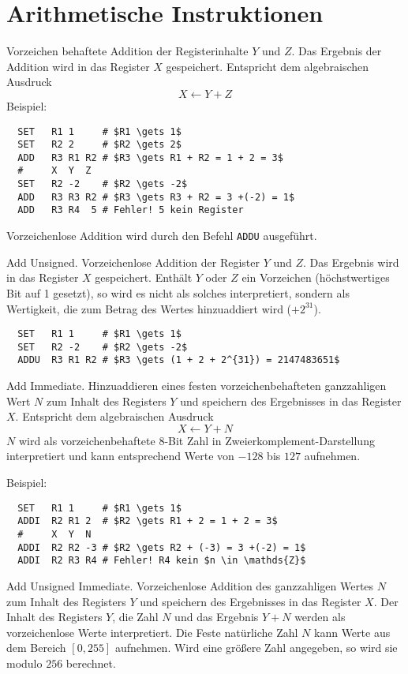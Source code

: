 \section{Arithmetische Instruktionen} 

Vorzeichen behaftete Addition der Registerinhalte $Y$ und $Z$.
Das Ergebnis der Addition wird in das Register $X$ gespeichert.
Entspricht dem algebraischen Ausdruck
\[
    X \gets Y + Z
\]
Beispiel:
\begin{lstlisting}
  SET   R1 1     # $R1 \gets 1$
  SET   R2 2     # $R2 \gets 2$
  ADD   R3 R1 R2 # $R3 \gets R1 + R2 = 1 + 2 = 3$
  #     X  Y  Z
  SET   R2 -2    # $R2 \gets -2$
  ADD   R3 R3 R2 # $R3 \gets R3 + R2 = 3 +(-2) = 1$
  ADD   R3 R4  5 # Fehler! 5 kein Register
\end{lstlisting}
Vorzeichenlose Addition wird durch den Befehl \texttt{ADDU} ausgeführt.


\glqq Add Unsigned\grqq.
Vorzeichenlose Addition der Register $Y$ und $Z$. Das Ergebnis wird in das
Register $X$ gespeichert. Enthält $Y$ oder $Z$ ein Vorzeichen (höchstwertiges
Bit auf 1 gesetzt), so wird es nicht als solches interpretiert, sondern als
Wertigkeit, die zum Betrag des Wertes hinzuaddiert wird ($+2^{31}$).

\begin{lstlisting}
  SET   R1 1     # $R1 \gets 1$
  SET   R2 -2    # $R2 \gets -2$
  ADDU  R3 R1 R2 # $R3 \gets (1 + 2 + 2^{31}) = 2147483651$
\end{lstlisting}



\glqq Add Immediate\grqq.
Hinzuaddieren eines festen vorzeichenbehafteten ganzzahligen Wert $N$ zum Inhalt
des Registers $Y$ und speichern des Ergebnisses in das Register $X$.
Entspricht dem algebraischen Ausdruck
\[
  X \gets Y + N
\]
$N$ wird als vorzeichenbehaftete 8-Bit Zahl in Zweierkomplement-Darstellung
interpretiert und kann entsprechend Werte von $-128$ bis $127$ aufnehmen.

Beispiel:
\begin{lstlisting}
  SET   R1 1     # $R1 \gets 1$
  ADDI  R2 R1 2  # $R2 \gets R1 + 2 = 1 + 2 = 3$
  #     X  Y  N
  ADDI  R2 R2 -3 # $R2 \gets R2 + (-3) = 3 +(-2) = 1$
  ADDI  R2 R3 R4 # Fehler! R4 kein $n \in \mathds{Z}$
\end{lstlisting}



\glqq Add Unsigned Immediate\grqq.
Vorzeichenlose Addition des ganzzahligen Wertes $N$ zum Inhalt des Registers $Y$
und speichern des Ergebnisses in das Register $X$.
Der Inhalt des Registers $Y$, die Zahl $N$ und das Ergebnis $Y + N$ werden als
vorzeichenlose Werte interpretiert.
Die Feste natürliche Zahl $N$ kann Werte aus dem Bereich $[0, 255]$ aufnehmen.
Wird eine größere Zahl angegeben, so wird sie modulo $256$ berechnet.



